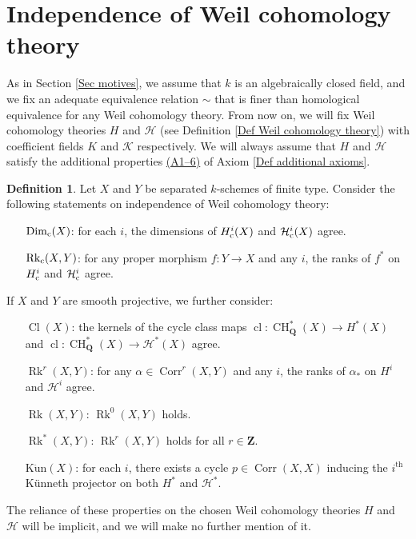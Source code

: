 \documentclass[11pt]{amsart}
\theoremstyle{definition}
\newtheorem{Def}[Thm]{Definition}
\renewcommand{\H}{\mathcal H}
\newcommand{\K}{\mathcal K}
\newcommand{\Z}{\mathbf Z}
\newcommand{\Q}{\mathbf Q}
\newcommand{\cs}{_{\text{\normalfont c}}}
\newcommand{\CH}{\operatorname{CH}}
\newcommand{\cl}{\operatorname{cl}}
\newcommand{\Corr}{\operatorname{Corr}}
\newcommand{\Rk}{\operatorname{Rk}}
\newcommand{\Dim}{\operatorname{Dim}}
\newcommand{\Kun}{\operatorname{K\ddot un}}
\newcommand{\Cl}{\operatorname{Cl}}
\begin{document}
\section{Independence of Weil cohomology theory}\label{Sec independence}
As in Section \ref{Sec motives}, we assume that $k$ is an
algebraically closed field, and we fix an adequate equivalence
relation $\sim$ that is finer than homological equivalence for any
Weil cohomology theory.
%
From now on, we will fix Weil cohomology theories $H$ and $\H$ (see
Definition \ref{Def Weil cohomology theory}) with coefficient fields
$K$ and $\K$ respectively. We will always assume that $H$ and $\H$
satisfy the additional properties \hyperref[Ax compactly supported
cohomology]{(A1--6)} of Axiom \ref{Def additional axioms}.

\begin{Def}\label{Def conjectures}
Let $X$ and $Y$ be separated $k$-schemes of finite type. Consider
the following statements on independence of Weil cohomology theory:
{
\begin{itemize}%
\item[$\Dim\cs(X)$:] for each $i$, the dimensions of $H^i\cs(X)$ and $\H^i\cs(X)$ agree.
\item[$\Rk\cs(X,Y)$:] for any proper morphism $f \colon Y \to X$ and any $i$, the ranks of $f^*$ on $H^i\cs$ and $\H^i\cs$ agree.
\end{itemize}

\smallskip\noindent
If $X$ and $Y$ are smooth projective, we further consider:
\smallskip

\begin{itemize}%
\item[$\Cl(X)$:] the kernels of the cycle class maps $\cl \colon \CH^*_\Q(X) \to H^*(X)$ and $\cl \colon \CH^*_\Q(X) \to \H^*(X)$ agree.
\item[$\Rk^r(X,Y)$:] for any $\alpha \in \Corr^r(X,Y)$ and any $i$, the ranks of $\alpha_*$ on $H^i$ and $\H^i$ agree.
\item[$\Rk(X,Y)$:] $\Rk^0(X,Y)$ holds.
\item[$\Rk^*(X,Y)$:] $\Rk^r(X,Y)$ holds for all $r \in \Z$.
\item[$\Kun(X)$:] for each $i$, there exists a cycle $p \in \Corr(X,X)$ inducing the $i^{\text{th}}$ K\"unneth projector on both $H^*$ and $\H^*$.
\end{itemize}}

\smallskip
\noindent The reliance of these properties on the chosen Weil
cohomology theories $H$ and $\H$ will be implicit, and we will make
no further mention of it.
\end{Def}
\end{document}
